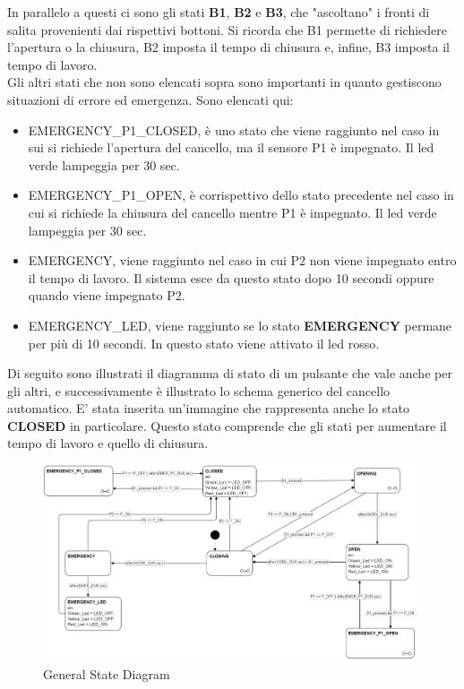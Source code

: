 \documentclass[12pt]{article}
\begin{document}
In parallelo a questi ci sono gli stati \textbf{B1}, \textbf{B2} e 
\textbf{B3}, che "ascoltano" i fronti di salita provenienti dai rispettivi bottoni.
Si ricorda che B1 permette di richiedere l'apertura o la chiusura, B2 imposta il tempo di chiusura e, infine, B3 imposta il tempo di lavoro.\\

Gli altri stati che non sono elencati sopra sono importanti in quanto gestiscono situazioni di errore ed emergenza. Sono elencati qui:

\begin{itemize}
    \item{EMERGENCY\_P1\_CLOSED,} è uno stato che viene raggiunto nel caso in sui si richiede l'apertura del cancello, ma il sensore P1 è impegnato. Il led verde lampeggia per 30 sec.
    \item{EMERGENCY\_P1\_OPEN,} è corrispettivo dello stato precedente nel caso in cui si richiede la chiusura del cancello mentre P1 è impegnato. Il led verde lampeggia per 30 sec.
    \item{EMERGENCY,} viene raggiunto nel caso in cui P2 non viene impegnato entro il tempo di lavoro. Il sistema esce da questo stato dopo 10 secondi oppure quando viene impegnato P2.
    \item{EMERGENCY\_LED}, viene raggiunto se lo stato \textbf{EMERGENCY} permane per più di 10 secondi. In questo stato viene attivato il led rosso.
\end{itemize}

Di seguito sono illustrati il diagramma di stato di un pulsante che vale anche per gli altri, e successivamente è illustrato lo schema generico del cancello automatico. E' stata inserita un'immagine che rappresenta anche lo stato \textbf{CLOSED} in particolare. Questo stato comprende che gli stati per aumentare il tempo di lavoro e quello di chiusura.
\newpage
\begin{landscape}
\begin{figure}[h] %
    \centering %
    \includegraphics[width=1.5\textwidth]{state_diagram0.png} %
    \caption{General State Diagram} %
    \label{fig:General State Diagram} %
\end{figure}
\end{landscape}
\end{document}
